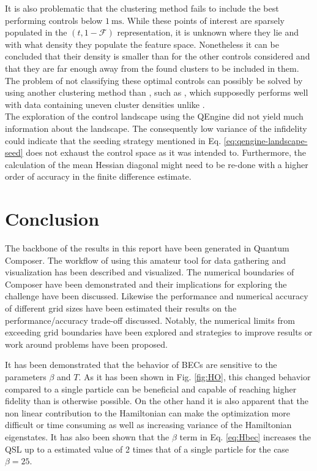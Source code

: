 \documentclass[a4paper, twocolumn]{revtex4-1}
\begin{document}
It is also problematic that the clustering method fails to include the best performing controls below $\SI{1}{\milli\second}$. While these points of interest are sparsely populated in the $(t,1-\mathcal{F})$ representation, it is unknown where they lie and with what density they populate the feature space. Nonetheless it can be concluded that their density is smaller than for the other controls considered and that they are far enough away from the found clusters to be included in them. The problem of not classifying these optimal controls can possibly be solved by using another clustering method than , such as , which supposedly performs well with data containing uneven cluster densities unlike . \\

The exploration of the control landscape using the QEngine did not yield much information about the landscape. The consequently low variance of the infidelity could indicate that the seeding strategy mentioned in Eq. \eqref{eq:qengine-landscape-seed} does not exhaust the control space as it was intended to. Furthermore, the calculation of the mean Hessian diagonal might need to be re-done with a higher order of accuracy in the finite difference estimate.

\section{Conclusion}\label{sec:conclusion}
The backbone of the results in this report have been generated in Quantum Composer. The workflow of using this amateur tool for data gathering and visualization has been described and visualized. 
The numerical boundaries of Composer have been demonstrated and their implications for exploring the challenge have been discussed. Likewise the performance and numerical accuracy of different grid sizes have been estimated their results on the performance/accuracy trade-off discussed. Notably, the numerical limits from exceeding grid boundaries have been explored and strategies to improve results or work around problems have been proposed.

It has been demonstrated that the behavior of BECs are sensitive to the parameters $\beta$ and $T$. As it has been shown in Fig. \ref{fig:HO}, this changed behavior compared to a single particle can be beneficial and capable of reaching higher fidelity than is otherwise possible. On the other hand it is also apparent that the non linear contribution to the Hamiltonian can make the optimization more difficult or time consuming as well as increasing variance of the Hamiltonian eigenstates. It has also been shown that the $\beta$ term in Eq. \eqref{eq:Hbec} increases the QSL up to a estimated value of 2 times that of a single particle for the case $\beta=25$. 
\end{document}
